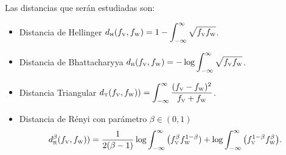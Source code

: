 %
%
%

Las distancias que serán estudiadas son:

\begin{itemize}
	\item Distancia de Hellinger $d_\text{\tiny H}(f_\text{\tiny V},f_\text{\tiny W})=1-\displaystyle{\int_{-\infty}^{\infty}\sqrt{f_\text{\tiny V} f_\text{\tiny W}}}$.
	
	\item Distancia de Bhattacharyya $d_\text{\tiny B}(f_\text{\tiny V},f_\text{\tiny W})=-\log\displaystyle{\int_{-\infty}^{\infty}\sqrt{f_\text{\tiny V} f_\text{\tiny W}}}$.
	
	\item Distancia Triangular $d_\text{\tiny T}(f_\text{\tiny V},f_\text{\tiny W}))=\displaystyle{\int_{-\infty}^{\infty}\frac{(f_\text{\tiny V}-f_\text{\tiny W})^2}{f_\text{\tiny V}+f_\text{\tiny W}}}$.
	
	\item Distancia de R\'enyi con parámetro $\beta\in(0,1)$
	$$
	d_\text{\tiny R}^{\beta}(f_\text{\tiny V},f_\text{\tiny W}))=\frac{1}{2(\beta-1)}\log\displaystyle{\int_{-\infty}^{\infty}\big({f_\text{\tiny V}^{\beta}f_\text{\tiny W}^{1-\beta})}+\log\displaystyle{\int_{-\infty}^{\infty}\big(f_\text{\tiny V}^{1-\beta}f_\text{\tiny W}^{\beta}}}\big).
	$$
\end{itemize}

